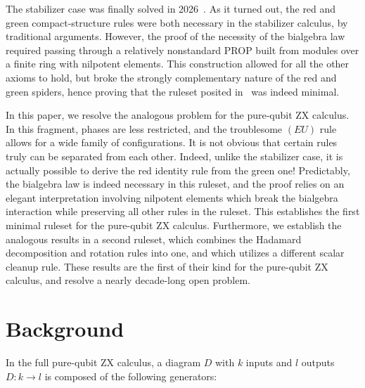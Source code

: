\documentclass[copyright,creativecommons]{eptcs}
\theoremstyle{definition}
\theoremstyle{remark}
\begin{document}
The stabilizer case was finally solved in 2026~\cite{stoltz2026simplified}. As it turned out, the red and green compact-structure rules were both necessary in the stabilizer calculus, by traditional arguments. However, the proof of the necessity of the bialgebra law required passing through a relatively nonstandard PROP built from modules over a finite ring with nilpotent elements. This construction allowed for all the other axioms to hold, but broke the strongly complementary nature of the red and green spiders, hence proving that the ruleset posited in~\cite{Backens_2020} was indeed minimal.

In this paper, we resolve the analogous problem for the pure-qubit ZX calculus. In this fragment, phases are less restricted, and the troublesome \((EU)\) rule allows for a wide family of configurations. It is not obvious that certain rules truly can be separated from each other. Indeed, unlike the stabilizer case, it is actually possible to derive the red identity rule from the green one! Predictably, the bialgebra law is indeed necessary in this ruleset, and the proof relies on an elegant interpretation involving nilpotent elements which break the bialgebra interaction while preserving all other rules in the ruleset. This establishes the first minimal ruleset for the pure-qubit ZX calculus. Furthermore, we establish the analogous results in a second ruleset, which combines the Hadamard decomposition and rotation rules into one, and which utilizes a different scalar cleanup rule. These results are the first of their kind for the pure-qubit ZX calculus, and resolve a nearly decade-long open problem.

\section{Background}
\label{sec:background}

In the full pure-qubit ZX calculus, a diagram \(D\) with \(k\) inputs and \(l\) outputs  \(D:k\to l\) is composed of the following generators:
\end{document}
